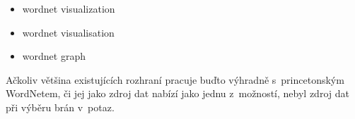 \documentclass[a4paper,11pt,openany,twoside]{book}
\begin{document}
					\begin{itemize}
						\item wordnet visualization
						\item wordnet visualisation
						\item wordnet graph
					\end{itemize}

					 Ačkoliv většina existujících rozhraní pracuje buďto výhradně s~princetonským WordNetem, či jej jako zdroj dat nabízí jako jednu z~možností, nebyl zdroj dat při výběru brán v~potaz.

\end{document}
